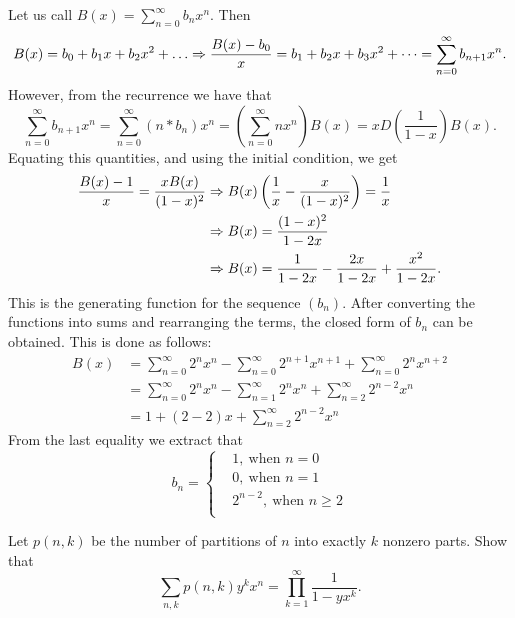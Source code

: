 \documentclass[12pt]{memoir}
\begin{document}
\begin{ptcbr}
Let us call $B(x)=\sum_{n=0}^\infty b_nx^n$. Then 
$$B(x)=b_0+b_1x+b_2x^2+\dots\To \frac{B(x)-b_0}{x}=b_1+b_2x+b_3x^2+\dots=\sum_{n=0}^\infty b_{n+1}x^n.$$
However, from the recurrence we have that 
$$\sum_{n=0}^\infty b_{n+1}x^n=\sum_{n=0}^\infty (n\ast b_n)x^n=\left(\sum_{n=0}^\infty nx^n\right)B(x)=xD\left(\frac{1}{1-x}\right)B(x).$$
Equating this quantities, and using the initial condition, we get
\begin{align*}
    \frac{B(x)-1}{x}=\frac{xB(x)}{(1-x)^2}&\Rightarrow B(x)\left(\frac{1}{x}-\frac{x}{(1-x)^2}\right)=\frac{1}{x}\\
    &\Rightarrow B(x)=\frac{(1-x)^2}{1-2x}\\
    &\Rightarrow B(x)=\frac{1}{1-2x}-\frac{2x}{1-2x}+\frac{x^2}{1-2x}.
\end{align*}
This is the generating function for the sequence $(b_n)$. After converting the functions into sums and rearranging the terms, the closed form of $b_n$ can be obtained. This is done as follows:
\begin{align*}
    B(x)&=\sum_{n=0}^\infty2^nx^n-\sum_{n=0}^\infty2^{n+1}x^{n+1}+\sum_{n=0}^\infty2^nx^{n+2}\\
    &=\sum_{n=0}^\infty2^nx^n-\sum_{n=1}^\infty2^{n}x^{n}+\sum_{n=2}^\infty2^{n-2}x^{n}\\
    &=1+(2-2)x+\sum_{n=2}^\infty2^{n-2}x^{n}
\end{align*}
From the last equality we extract that 
$$b_n=\left\lbrace\begin{aligned}
    &1,\ \text{when }n=0\\
    &0,\ \text{when }n=1\\
    &2^{n-2},\ \text{when }n\geq 2\\
\end{aligned}\right.$$
\end{ptcbr}

\begin{Ej}[Exercise 8]
    Let $p(n,k)$ be the number of partitions of $n$ into exactly $k$ nonzero parts. Show that 
    $$\sum_{n,k}p(n,k)y^kx^n=\prod_{k=1}^\infty\frac{1}{1-yx^k}.$$
\end{Ej}
\end{document}
